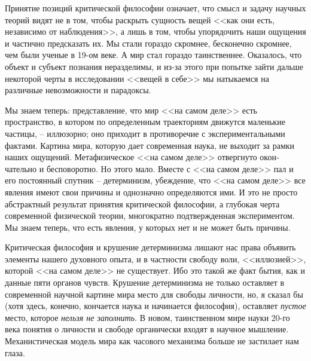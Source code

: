 \documentclass{book}
\begin{document}
Принятие позиций критической философии означает, что смысл и задачу научных теорий видят не в том, чтобы раскрыть сущность вещей <<как они есть, независимо от наблюдения>>, а лишь в том, чтобы упорядочить наши ощущения и частично предсказать их. Мы стали гораздо скромнее, бесконечно скром­нее, чем были ученые в 19-ом веке. А мир стал гораздо таинст­веннее. Оказалось, что объект и субъект познания неразделимы, и из-за этого при попытке зайти дальше некоторой черты в ис­следовании <<вещей в себе>> мы натыкаемся на различные невоз­можности и парадоксы.

Мы знаем теперь: представление, что мир <<на самом деле>> есть пространство, в котором по определенным траекториям движутся маленькие частицы, -- иллюзорно; оно приходит в противоречие с экспериментальными фактами. Картина мира, которую дает современная наука, не выходит за рамки наших ощущений. Метафизическое <<на самом деле>> отвергнуто окон­чательно и бесповоротно. Но этого мало. Вместе с <<на самом деле>> пал и его постоянный спутник -- детерминизм, убежде­ние, что <<на самом деле>> все явления имеют свои причины и однозначно определяются ими. И это не просто абстрактный результат принятия критической философии, а глубокая черта современной физической теории, многократно подтвержденная экспериментом. Мы знаем теперь, что есть явления, у которых нет и не может быть причины.

Критическая философия и крушение детерминизма лишают нас права объявить элементы нашего духовного опыта, и в частности свободу воли, <<иллюзией>>, которой <<на самом деле>> не существует. Ибо это такой же факт бытия, как и данные пяти органов чувств. Крушение детерминизма не только оставляет в современной научной картине мира место для свободы личности, но, я сказал бы (хотя здесь, конечно, кончается наука и начинается философия), оставляет \textit{пустое}  место, которое \textit{нельзя не заполнить}.  В новом, таинственном мире науки 20-го века понятия о личности и свободе органически входят в науч­ное мышление. Механистическая модель мира как часового механизма больше не застилает нам глаза.
\end{document}
